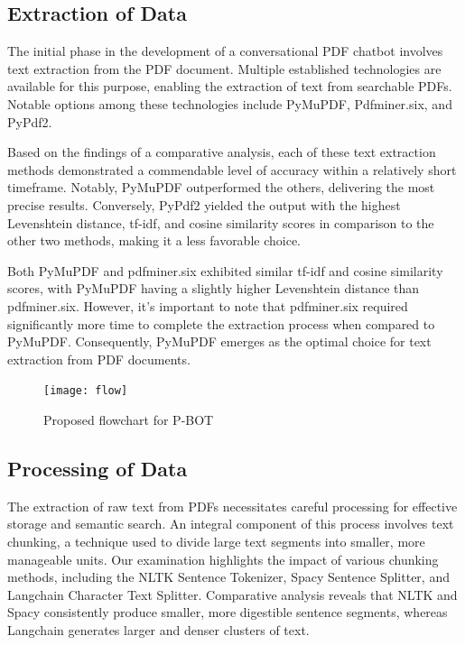 \documentclass[conference]{IEEEtran}
\begin{document}
\subsection{Extraction of Data}

The initial phase in the development of a conversational PDF chatbot involves text extraction from the PDF document. Multiple established technologies are available for this purpose, enabling the extraction of text from searchable PDFs. Notable options among these technologies include PyMuPDF, Pdfminer.six, and PyPdf2.

Based on the findings of a comparative analysis, each of these text extraction methods demonstrated a commendable level of accuracy within a relatively short timeframe. Notably, PyMuPDF outperformed the others, delivering the most precise results. Conversely, PyPdf2 yielded the output with the highest Levenshtein distance, tf-idf, and cosine similarity scores in comparison to the other two methods, making it a less favorable choice.

Both PyMuPDF and pdfminer.six exhibited similar tf-idf and cosine similarity scores, with PyMuPDF having a slightly higher Levenshtein distance than pdfminer.six. However, it's important to note that pdfminer.six required significantly more time to complete the extraction process when compared to PyMuPDF. Consequently, PyMuPDF emerges as the optimal choice for text extraction from PDF documents.

\begin{figure}
    \centering
    \texttt{[image: flow]}
    \caption{Proposed flowchart for P-BOT}
    \label{fig:your_image_label}
\end{figure}

\subsection{Processing of Data}

The extraction of raw text from PDFs necessitates careful processing for effective storage and semantic search. An integral component of this process involves text chunking, a technique used to divide large text segments into smaller, more manageable units. Our examination highlights the impact of various chunking methods, including the NLTK Sentence Tokenizer, Spacy Sentence Splitter, and Langchain Character Text Splitter. Comparative analysis reveals that NLTK and Spacy consistently produce smaller, more digestible sentence segments, whereas Langchain generates larger and denser clusters of text.
\end{document}
